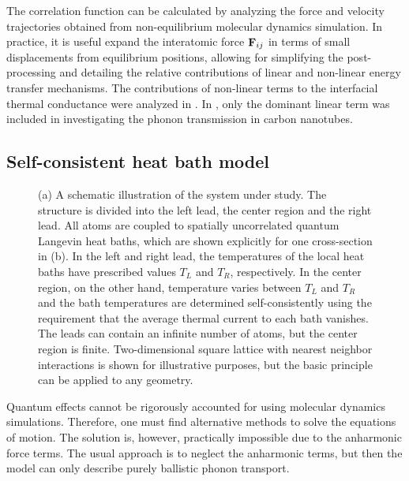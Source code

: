 The correlation function can be calculated by analyzing the force and velocity trajectories obtained from non-equilibrium molecular dynamics simulation. In practice, it is useful expand the interatomic force $\mathbf{F}_{ij}$ in terms of small displacements from equilibrium positions, allowing for simplifying the post-processing and detailing the relative contributions of linear and non-linear energy transfer mechanisms. The contributions of non-linear terms to the interfacial thermal conductance were analyzed in . In , only the dominant linear term was included in investigating the phonon transmission in carbon nanotubes.


\subsection{Self-consistent heat bath model}




\begin{figure}
\begin{center}
 \caption{(a) A schematic illustration of the system under study. The structure is divided into the left lead, the center region and the right lead. All atoms are coupled to spatially uncorrelated quantum Langevin heat baths, which are shown explicitly for one cross-section in (b). In the left and right lead, the temperatures of the local heat baths have prescribed values $T_L$ and $T_R$, respectively. In the center region, on the other hand, temperature varies between $T_L$ and $T_R$ and the bath temperatures are determined self-consistently using the requirement that the average thermal current to each bath vanishes. The leads can contain an infinite number of atoms, but the center region is finite. Two-dimensional square lattice with nearest neighbor interactions is shown for illustrative purposes, but the basic principle can be applied to any geometry.}
\label{fig:sud1}
\end{center}
\end{figure}

Quantum effects cannot be rigorously accounted for using molecular dynamics simulations. Therefore, one must find alternative methods to solve the equations of motion. The solution is, however, practically impossible due to the anharmonic force terms. The usual approach is to neglect the anharmonic terms, but then the model can only describe purely ballistic phonon transport. 

